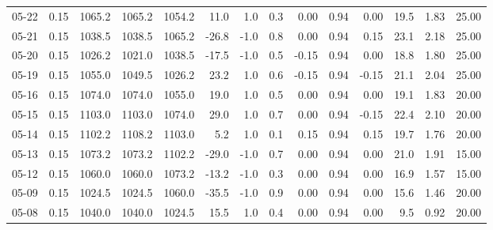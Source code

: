 \begin{threeparttable}
{\begin{tabular}{lrrrrrrrrrrrrr}
  05-22 &     0.15 & 1065.2 & 1065.2 & 1054.2 &       11.0 &                      1.0 &                 0.3 &       0.00 &      0.94 &           0.00 &             19.5 &            1.83 &                  25.00 \\
  05-21 &     0.15 & 1038.5 & 1038.5 & 1065.2 &      -26.8 &                     -1.0 &                 0.8 &       0.00 &      0.94 &           0.15 &             23.1 &            2.18 &                  25.00 \\
  05-20 &     0.15 & 1026.2 & 1021.0 & 1038.5 &      -17.5 &                     -1.0 &                 0.5 &      -0.15 &      0.94 &           0.00 &             18.8 &            1.80 &                  25.00 \\
  05-19 &     0.15 & 1055.0 & 1049.5 & 1026.2 &       23.2 &                      1.0 &                 0.6 &      -0.15 &      0.94 &          -0.15 &             21.1 &            2.04 &                  25.00 \\
  05-16 &     0.15 & 1074.0 & 1074.0 & 1055.0 &       19.0 &                      1.0 &                 0.5 &       0.00 &      0.94 &           0.00 &             19.1 &            1.83 &                  20.00 \\
  05-15 &     0.15 & 1103.0 & 1103.0 & 1074.0 &       29.0 &                      1.0 &                 0.7 &       0.00 &      0.94 &          -0.15 &             22.4 &            2.10 &                  20.00 \\
  05-14 &     0.15 & 1102.2 & 1108.2 & 1103.0 &        5.2 &                      1.0 &                 0.1 &       0.15 &      0.94 &           0.15 &             19.7 &            1.76 &                  20.00 \\
  05-13 &     0.15 & 1073.2 & 1073.2 & 1102.2 &      -29.0 &                     -1.0 &                 0.7 &       0.00 &      0.94 &           0.00 &             21.0 &            1.91 &                  15.00 \\
  05-12 &     0.15 & 1060.0 & 1060.0 & 1073.2 &      -13.2 &                     -1.0 &                 0.3 &       0.00 &      0.94 &           0.00 &             16.9 &            1.57 &                  15.00 \\
  05-09 &     0.15 & 1024.5 & 1024.5 & 1060.0 &      -35.5 &                     -1.0 &                 0.9 &       0.00 &      0.94 &           0.00 &             15.6 &            1.46 &                  20.00 \\
  05-08 &     0.15 & 1040.0 & 1040.0 & 1024.5 &       15.5 &                      1.0 &                 0.4 &       0.00 &      0.94 &           0.00 &              9.5 &            0.92 &                  20.00 \\

\end{tabular}}
\end{threeparttable}
